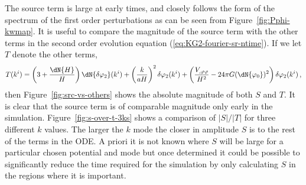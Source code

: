 The source term is large at early times, and closely follows the form
of the spectrum of the first order perturbations as can be seen from
Figure~\ref{fig:Pphi-kwmap}.
%
It is useful to compare the magnitude of the source term with the
other terms in the second order evolution equation
(\ref{eq:KG2-fourier-sr-ntime}). If we let $T$ denote the other terms,
%
\begin{equation}
\label{eq:Tdefn}
 T(\kvi) = \left(3 + \frac{\dN{H}}{H}\right)
\dN{\dvp2}(\kvi)+ \left(\frac{k}{aH}\right)^2\dvp2(\kvi)
+\left(\frac{\Upp}{H^2}-{24 \pi G}(\dN{\vp_{0}})^2\right)
\dvp2(\kvi) \,,
\end{equation}
%
then Figure~\ref{fig:src-vs-others} shows the absolute magnitude of
both $S$ and $T$.  It is clear that the source term is of comparable
magnitude only early in the simulation.  Figure~\ref{fig:s-over-t-3ks}
shows a comparison of $|S|/|T|$ for three different $k$ values. The larger the $k$ mode the closer
in amplitude $S$ is to the rest of the terms in the ODE.
A priori it is not known
where $S$ will be large for a particular chosen potential and mode but
once determined it could be possible to significantly reduce the time required
for the simulation by only calculating $S$ in the regions where it is
important.
%

